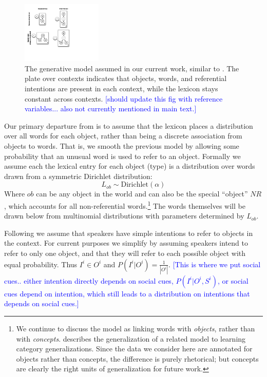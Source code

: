 \documentclass[man,noapacite,12pt]{apa2}
\newcommand{\nnote}[1]{\textcolor{blue}{[#1]}}
\begin{document}
\begin{figure}[tr]
\begin{center}
\includegraphics[width=1.5in]{figures/gen_mod.pdf}
\caption{\label{fig:genmod} The generative model assumed in our current work, similar to \protect{}. The plate over contexts indicates that objects, words, and referential intentions are present in each context, while the lexicon stays constant across contexts. \nnote{should update this fig with reference variables... also not currently mentioned in main text.}}
\end{center}
\end{figure}

Our primary departure from  is to assume that the lexicon places a distribution over all words for each object, rather than being a discrete association from objects to words. That is, we smooth the previous model by allowing some probability that an unusual word is used to refer to an object. Formally we assume each the lexical entry for each object (type) is a distribution over words drawn from a symmetric Dirichlet distribution:
\begin{equation}
\label{eqn:lexprior}
L_{ob} \sim \text{Dirichlet}(\alpha)
\end{equation}
Where $ob$ can be any object in the world and can also be the special ``object'' $NR$, which accounts for all non-referential words.\footnote{We continue to discuss the model as linking words with \emph{objects}, rather than with \emph{concepts}.  describes the generalization of a related model to learning category generalizations. Since the data we consider here are annotated for objects rather than concepts, the difference is purely rhetorical; but concepts are clearly the right units of generalization for future work.}
The words themselves will be drawn below from multinomial distributions with parameters determined by $L_{ob}$.

Following  we assume that speakers have simple intentions to refer to objects in the context. For current purposes we simplify by assuming speakers intend to refer to only one object, and that they will refer to each possible object with equal probability. Thus $I^{i} \in O^{i}$ and
$P(I^{i}| O^{i}) = \frac{1}{|O^{i}|}$.
\nnote{This is where we put social cues.. either intention directly depends on social cues, $P(I^{i}| O^{i},S^{i})$, or social cues depend on intention, which still leads to a distribution on intentions that depends on social cues.}
\end{document}
